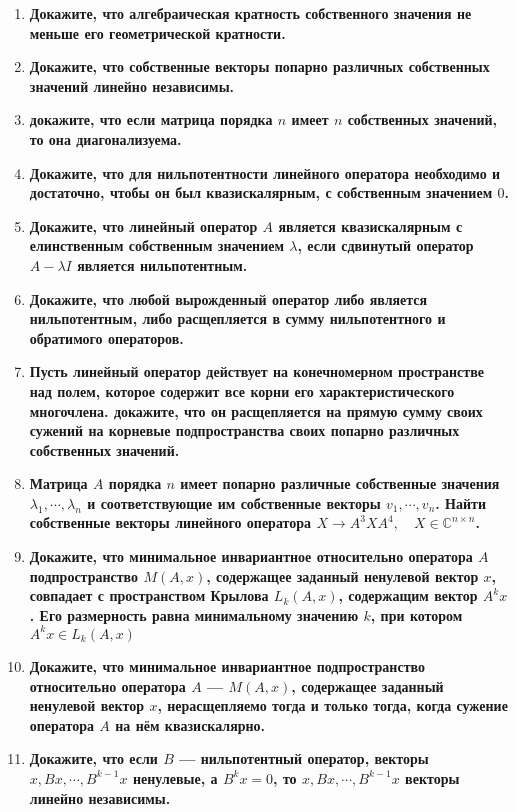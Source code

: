 \documentclass[12pt]{article} %
\begin{document}
\begin{enumerate}
    \item \textbf{Докажите, что алгебраическая кратность собственного значения не меньше его геометрической кратности.}
    \item \textbf{Докажите, что собственные векторы попарно различных собственных значений линейно независимы.}
    \item \textbf{докажите, что если матрица порядка $n$ имеет $n$ собственных значений, то она диагонализуема.}
    \item \textbf{Докажите, что для нильпотентности линейного оператора необходимо и достаточно, чтобы он был квазискалярным, с собственным значением $0$.}
    \item \textbf{Докажите, что линейный оператор  $A$ является квазискалярным с елинственным собственным значением $\lambda$, если сдвинутый оператор $A - \lambda I$ является нильпотентным.}
    \item \textbf{Докажите, что любой вырожденный оператор либо является нильпотентным, либо расщепляется в сумму нильпотентного и обратимого операторов.}
    \item \textbf{Пусть линейный оператор действует на конечномерном пространстве над полем, которое содержит все корни его характеристического многочлена. докажите, что он расщепляется на прямую сумму своих сужений на корневые подпространства своих попарно различных собственных значений.}
    \item \textbf{Матрица $A$ порядка $n$ имеет попарно различные собственные значения $\lambda_1, \cdots ,\lambda_n$ и соответствующие им собственные векторы $v_1, \cdots, v_n $. Найти собственные векторы линейного оператора $X \rightarrow A^3XA^4, \quad X \in \mathds{C}^{n \times n}$.}
    \item \textbf{Докажите, что минимальное инвариантное относительно оператора $A$ подпространство $M(A, x)$, содержащее заданный ненулевой вектор $x$, совпадает с пространством Крылова $L_k(A, x)$, содержащим вектор $A^kx$. Его размерность равна минимальному значению $k$, при котором $A^kx \in L_k(A, x)$}
    \item \textbf{Докажите, что минимальное инвариантное подпространство относительно оператора $A$ --- $M(A, x)$, содержащее заданный ненулевой вектор $x$, нерасщепляемо тогда и только тогда, когда сужение оператора $A$ на нём квазискалярно.}
    \item \textbf{Докажите, что если $B$ --- нильпотентный оператор, векторы $x, Bx, \cdots, B^{k - 1}x$ ненулевые, а $B^kx = 0$, то $x, Bx, \cdots, B^{k - 1}x$ векторы линейно независимы.}

\end{enumerate}
\end{document}
